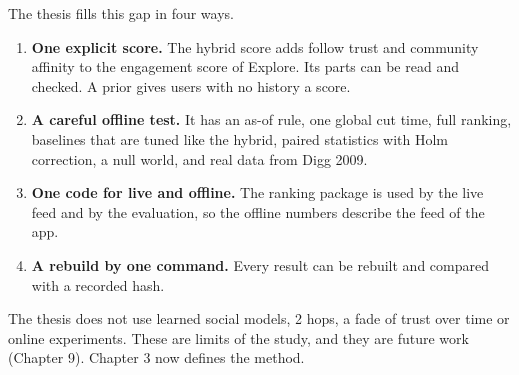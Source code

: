 The thesis fills this gap in four ways.
\begin{enumerate}
  \item \textbf{One explicit score.} The hybrid score adds follow trust and community affinity to the engagement score of Explore. Its parts can be read and checked. A prior gives users with no history a score.
  \item \textbf{A careful offline test.} It has an as-of rule, one global cut time, full ranking, baselines that are tuned like the hybrid, paired statistics with Holm correction, a null world, and real data from Digg 2009.
  \item \textbf{One code for live and offline.} The ranking package is used by the live feed and by the evaluation, so the offline numbers describe the feed of the app.
  \item \textbf{A rebuild by one command.} Every result can be rebuilt and compared with a recorded hash.
\end{enumerate}

The thesis does not use learned social models, 2 hops, a fade of trust over time or online experiments. These are limits of the study, and they are future work (Chapter 9). Chapter 3 now defines the method.
